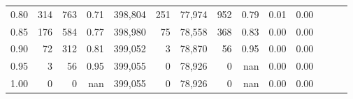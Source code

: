 \begin{tabular}{rrrrrrrrrrrrrr}
0.80 &      314 &     763 &  0.71 &  398,804 &      251 &  77,974 &     952 &  0.79 &  0.01 &      0.00 \\
0.85 &      176 &     584 &  0.77 &  398,980 &       75 &  78,558 &     368 &  0.83 &  0.00 &      0.00 \\
0.90 &       72 &     312 &  0.81 &  399,052 &        3 &  78,870 &      56 &  0.95 &  0.00 &      0.00 \\
0.95 &        3 &      56 &  0.95 &  399,055 &        0 &  78,926 &       0 &   nan &  0.00 &      0.00 \\
1.00 &        0 &       0 &   nan &  399,055 &        0 &  78,926 &       0 &   nan &  0.00 &      0.00 \\
\bottomrule
\end{tabular}
